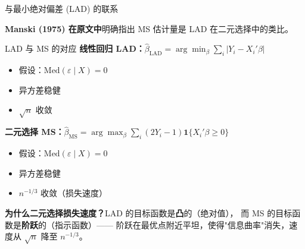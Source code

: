 \documentclass[aspectratio=169, 10pt]{beamer}
\begin{document}
\begin{frame}{与最小绝对偏差 (LAD) 的联系}

  \textbf{Manski (1975) 在原文中}明确指出 MS 估计量是 LAD 在二元选择中的类比。

  \begin{definitionbox}{{LAD 与 MS 的对应}}
    \textbf{线性回归 LAD：}$\hat\beta_{\text{LAD}} = \arg\min_\beta \sum_i |Y_i - X_i'\beta|$
    \begin{itemize}\setlength{\itemsep}{1pt}
      \item 假设：$\text{Med}(\varepsilon \mid X) = 0$
      \item 异方差稳健
      \item $\sqrt{n}$ 收敛
    \end{itemize}

    \textbf{二元选择 MS：}$\hat\beta_{\text{MS}} = \arg\max_\beta \sum_i (2Y_i-1)\mathbf{1}\{X_i'\beta \geq 0\}$
    \begin{itemize}\setlength{\itemsep}{1pt}
      \item 假设：$\text{Med}(\varepsilon \mid X) = 0$
      \item 异方差稳健
      \item $n^{-1/3}$ 收敛（损失速度）
    \end{itemize}
  \end{definitionbox}

  \begin{highlightbox}
    \textbf{为什么二元选择损失速度？}LAD 的目标函数是\textbf{凸}的（绝对值），
    而 MS 的目标函数是\textbf{阶跃}的（指示函数）——
    阶跃在最优点附近平坦，使得"信息曲率"消失，速度从 $\sqrt{n}$ 降至 $n^{-1/3}$。
  \end{highlightbox}

\end{frame}
\end{document}
